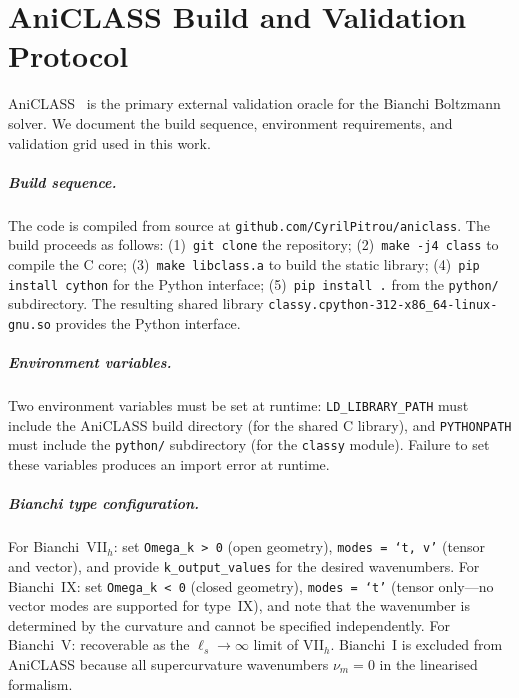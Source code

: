 \chapter{AniCLASS Build and Validation Protocol}
\label{app:aniclass}

AniCLASS~\cite{VicentePereiraPitrou2026} is the primary
external validation oracle for the Bianchi Boltzmann solver.
We document the build sequence, environment requirements, and
validation grid used in this work.


\paragraph{Build sequence.}

The code is compiled from source at
\texttt{github.com/CyrilPitrou/aniclass}.  The build
proceeds as follows:
(1)~\texttt{git clone} the repository;
(2)~\texttt{make -j4 class} to compile the C core;
(3)~\texttt{make libclass.a} to build the static library;
(4)~\texttt{pip install cython} for the Python interface;
(5)~\texttt{pip install .} from the \texttt{python/}
subdirectory.  The resulting shared library
\texttt{classy.cpython-312-x86\_64-linux-gnu.so} provides
the Python interface.


\paragraph{Environment variables.}

Two environment variables must be set at runtime:
\texttt{LD\_LIBRARY\_PATH} must include the AniCLASS build
directory (for the shared C library), and
\texttt{PYTHONPATH} must include the \texttt{python/}
subdirectory (for the \texttt{classy} module).  Failure to
set these variables produces an import error at runtime.


\paragraph{Bianchi type configuration.}

For Bianchi~VII$_h$: set \texttt{Omega\_k > 0} (open
geometry), \texttt{modes = `t, v'} (tensor and vector),
and provide \texttt{k\_output\_values} for the desired
wavenumbers.  For Bianchi~IX: set \texttt{Omega\_k < 0}
(closed geometry), \texttt{modes = `t'} (tensor only---no
vector modes are supported for type~IX), and note that the
wavenumber is determined by the curvature and cannot be
specified independently.  For Bianchi~V: recoverable as
the $\ell_s \to \infty$ limit of VII$_h$.  Bianchi~I is
excluded from AniCLASS because all supercurvature
wavenumbers $\nu_m = 0$ in the linearised formalism.


